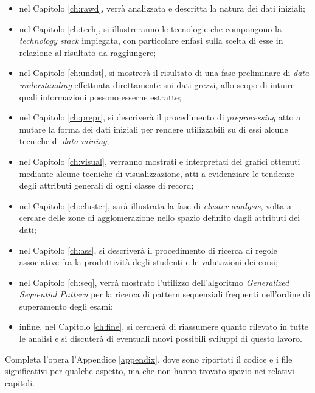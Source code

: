 \begin{itemize}
    \item nel Capitolo \ref{ch:rawd}, verrà analizzata e descritta la natura dei dati iniziali;
    \item nel Capitolo \ref{ch:tech}, si illustreranno le tecnologie che compongono la \textit{technology stack} impiegata, con particolare enfasi sulla scelta di esse in relazione al risultato da raggiungere;
    \item nel Capitolo \ref{ch:undst}, si mostrerà il risultato di una fase preliminare di \textit{data understanding} effettuata direttamente sui dati grezzi, allo scopo di intuire quali informazioni possono esserne estratte;
    \item nel Capitolo \ref{ch:prepr}, si descriverà il procedimento di \textit{preprocessing} atto a mutare la forma dei dati iniziali per rendere utilizzabili su di essi alcune tecniche di \textit{data mining};
    \item nel Capitolo \ref{ch:visual}, verranno mostrati e interpretati dei grafici ottenuti mediante alcune tecniche di visualizzazione, atti a evidenziare le tendenze degli attributi generali di ogni classe di record;
    \item nel Capitolo \ref{ch:cluster}, sarà illustrata la fase di \textit{cluster analysis}, volta a cercare delle zone di agglomerazione nello spazio definito dagli attributi dei dati;
    \item nel Capitolo \ref{ch:ass}, si descriverà il procedimento di ricerca di regole associative fra la produttività degli studenti e le valutazioni dei corsi;
    \item nel Capitolo \ref{ch:seq}, verrà mostrato l'utilizzo dell'algoritmo \textit{Generalized Sequential Pattern} per la ricerca di pattern sequenziali frequenti nell'ordine di superamento degli esami;
    \item infine, nel Capitolo \ref{ch:fine}, si cercherà di riassumere quanto rilevato in tutte le analisi e si discuterà di eventuali nuovi possibili sviluppi di questo lavoro.
\end{itemize}

Completa l'opera l'Appendice \ref{appendix}, dove sono riportati il codice e i file significativi per qualche aspetto, ma che non hanno trovato spazio nei relativi capitoli.
